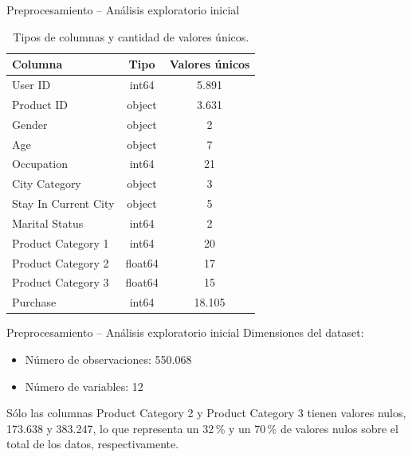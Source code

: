 \documentclass{beamer}
\begin{document}
    \begin{frame}{Preprocesamiento -- Análisis exploratorio inicial}
        \begin{table}[ht]
            \centering
            \caption{Tipos de columnas y cantidad de valores únicos.}
            \begin{tabular}{l c c }
                \toprule
                \textbf{Columna} & \textbf{Tipo} & \textbf{Valores únicos} \\
                \midrule
                User ID              & int64   & 5.891  \\
                Product ID           & object  & 3.631  \\
                Gender               & object  & 2      \\
                Age                  & object  & 7      \\
                Occupation           & int64   & 21     \\
                City Category        & object  & 3      \\
                Stay In Current City & object  & 5      \\
                Marital Status       & int64   & 2      \\
                Product Category 1   & int64   & 20     \\
                Product Category 2   & float64 & 17     \\
                Product Category 3   & float64 & 15     \\
                Purchase             & int64   & 18.105 \\
                \bottomrule
            \end{tabular}
            \label{tab:colsdataset}
        \end{table}
    \end{frame}
    \begin{frame}{Preprocesamiento -- Análisis exploratorio inicial}
        Dimensiones del dataset:
        \begin{itemize}
            \item Número de observaciones: 550.068
            \item Número de variables: 12
        \end{itemize}
        Sólo las columnas Product Category 2 y Product Category 3 tienen valores nulos,
        173.638 y 383.247, lo que representa un 32\,\% y un 70\,\%  de valores nulos sobre 
        el total de los datos, respectivamente.
    \end{frame}
\end{document}
